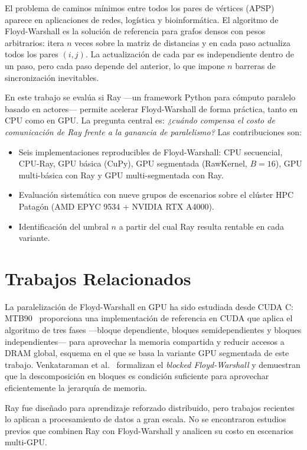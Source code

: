 \documentclass[conference]{IEEEtran}
\newcommand{\FW}{Floyd-Warshall}
\begin{document}
El problema de caminos mínimos entre todos los pares de vértices (APSP)
aparece en aplicaciones de redes, logística y bioinformática. El
algoritmo de \FW{} es la solución de referencia para grafos densos con
pesos arbitrarios: itera $n$ veces sobre la matriz de distancias y en
cada paso actualiza todos los pares $(i,j)$. La actualización de cada
par es independiente dentro de un paso, pero cada paso depende del
anterior, lo que impone $n$ barreras de sincronización inevitables.

En este trabajo se evalúa si Ray —un framework Python para cómputo
paralelo basado en actores— permite acelerar \FW{} de forma práctica,
tanto en CPU como en GPU. La pregunta central es: \textit{¿cuándo
compensa el costo de comunicación de Ray frente a la ganancia de
paralelismo?} Las contribuciones son:

\begin{itemize}
  \item Seis implementaciones reproducibles de \FW{}: CPU secuencial,
        CPU-Ray, GPU básica (CuPy), GPU segmentada (RawKernel, $B=16$),
        GPU multi-básica con Ray y GPU multi-segmentada con Ray.
  \item Evaluación sistemática con nueve grupos de escenarios sobre el
        clúster HPC Patagón (AMD EPYC 9534 + NVIDIA RTX A4000).
  \item Identificación del umbral $n$ a partir del cual Ray resulta
        rentable en cada variante.
\end{itemize}

\section{Trabajos Relacionados}
\label{sec:relacionados}

La paralelización de \FW{} en GPU ha sido estudiada desde CUDA C:
MTB90~\cite{mtb90} proporciona una implementación de referencia en CUDA
que aplica el algoritmo de tres fases —bloque dependiente, bloques
semidependientes y bloques independientes— para aprovechar la memoria
compartida y reducir accesos a DRAM global, esquema en el que se basa
la variante GPU segmentada de este trabajo.
Venkataraman et al.~\cite{venkataraman2003} formalizan el \textit{blocked
Floyd-Warshall} y demuestran que la descomposición en bloques es condición
suficiente para aprovechar eficientemente la jerarquía de memoria.

Ray fue diseñado para aprendizaje reforzado distribuido, pero trabajos
recientes lo aplican a procesamiento de datos a gran escala. No se
encontraron estudios previos que combinen Ray con \FW{} y analicen
su costo en escenarios multi-GPU.
\end{document}
